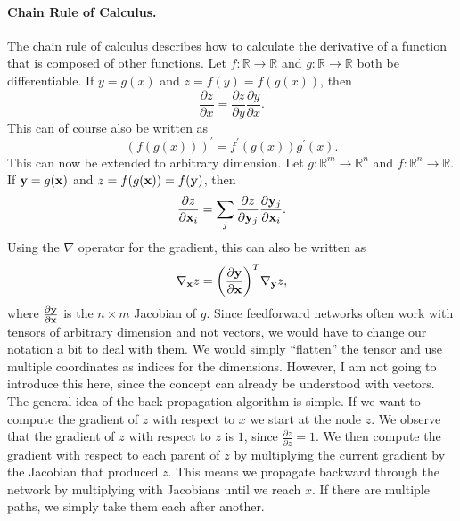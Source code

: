 \paragraph{Chain Rule of Calculus.}
The chain rule of calculus describes how to calculate the derivative of a function that is composed of other functions.
Let \(f: \mathbb{R} \rightarrow \mathbb{R}\) and \(g: \mathbb{R} \rightarrow \mathbb{R}\) both be differentiable.
If \(y = g(x)\) and \(z = f(y) = f(g(x))\), then
\begin{equation}
    \frac{\partial z}{\partial x} = \frac{\partial z}{\partial y} \frac{\partial y}{\partial x}.
\end{equation}
This can of course also be written as
\begin{equation}
    (f(g(x)))^\prime = f^\prime (g(x)) g^\prime(x).
\end{equation}
This can now be extended to arbitrary dimension.
Let \(g: \mathbb{R}^m \rightarrow \mathbb{R}^n\) and \(f: \mathbb{R}^n \rightarrow \mathbb{R}\).
If \(\mathbf{y} = g(\mathbf{x})\) and \(z = f(g(\mathbf{x})) = f(\mathbf{y})\), then
\begin{equation}
    \frac{\partial z}{\partial \mathbf{x}_{i}} = \sum_{j} \frac{\partial z}{\partial \mathbf{y}_{j}} \frac{\partial \mathbf{y}_{j}}{\partial \mathbf{x}_{i}}.
\end{equation}
Using the \(\nabla\) operator for the gradient, this can also be written as
\begin{equation}
    \label{eq:jacobian-vector-product}
    \nabla_{\mathbf{x}} z = \bigg( \frac{\partial \mathbf{y}}{\partial \mathbf{x}} \bigg)^{T} \nabla_{\mathbf{y}} z,
\end{equation}
where \(\frac{\partial \mathbf{y}}{\partial \mathbf{x}}\) is the \(n \times m\) Jacobian of \(g\).
Since feedforward networks often work with tensors of arbitrary dimension and not vectors, we would have to change our notation a bit to deal with them.
We would simply \enquote{flatten} the tensor and use multiple coordinates as indices for the dimensions.
However, I am not going to introduce this here, since the concept can already be understood with vectors. \\

The general idea of the back-propagation algorithm is simple.
If we want to compute the gradient of \(z\) with respect to \(x\) we start at the node \(z\).
We observe that the gradient of \(z\) with respect to \(z\) is \(1\), since \(\frac{\partial z}{\partial z} = 1\).
We then compute the gradient with respect to each parent of \(z\) by multiplying the current gradient by the Jacobian that produced \(z\).
This means we propagate backward through the network by multiplying with Jacobians until we reach \(x\).
If there are multiple paths, we simply take them each after another.

